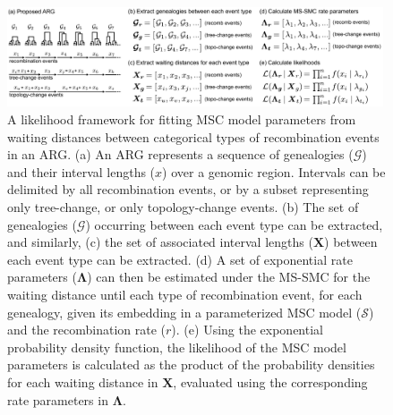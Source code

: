 \documentclass[11pt]{article}
\begin{document}
\begin{figure}[tp]
	\centering
	\includegraphics[width=0.99\textwidth]{figures/current/Fig6-ARG-likelihood-steps-full.pdf}
	\caption{
		A likelihood framework for fitting MSC model parameters from waiting distances
		between categorical types of recombination events in an ARG.
		(a) An ARG represents a sequence of genealogies ($\mathcal{G}$) and their
		interval lengths ($x$) over a genomic region. Intervals can be delimited 
		by all recombination events, or by a subset representing only tree-change, 
		or only topology-change events.
		(b) The set of genealogies ($\boldsymbol{\mathcal{G}}$) occurring between
		each event type can be extracted, and similarly, 
		(c) the set of associated interval lengths ($\boldsymbol{X}$) between
		each event type can be extracted.
		(d) A set of exponential rate parameters ($\boldsymbol{\Lambda}$) can 
		then be estimated under the MS-SMC for the waiting distance until 
		each type of recombination event, for each genealogy, given its 
		embedding in a parameterized MSC model
		($\mathcal{S}$) and the recombination rate ($r$).
		(e) Using the exponential probability density function, the likelihood 
		of the MSC model parameters is calculated as the product of the 
		probability densities for each waiting distance in $\boldsymbol{X}$,
		evaluated using the corresponding rate parameters in 
		$\boldsymbol{\Lambda}$.
	}
	\label{fig:likelihood-calculation}
\end{figure}
\end{document}
